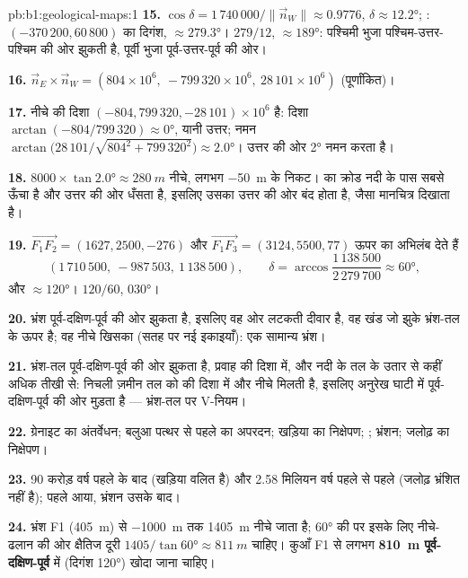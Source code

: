\begin{solution}{pb:b1:geological-maps:1}
\textbf{15.} $\cos\delta = 1\,740\,000/\|\vec n_W\| \approx 0.9776$, $\delta
\approx \ang{12.2}$; : $(-370\,200, 60\,800)$ का दिगंश,
$\approx \ang{279.3}$।  $279/12$,  $\approx \ang{189}$: पश्चिमी भुजा पश्चिम-उत्तर-पश्चिम की ओर झुकती है,
पूर्वी भुजा पूर्व-उत्तर-पूर्व की ओर।

\textbf{16.} $\vec n_E \times \vec n_W = (804 \times 10^6,\ -799\,320 \times
10^6,\ 28\,101 \times 10^6)$ (पूर्णांकित)।

\textbf{17.} नीचे की दिशा $(-804, 799\,320, -28\,101) \times
10^6$ है: दिशा $\arctan(-804/799\,320) \approx \ang{0}$, यानी उत्तर; नमन
$\arctan\bigl(28\,101/\sqrt{804^2 + 799\,320^2}\bigr) \approx \ang{2.0}$।  उत्तर की ओर \ang{2} नमन करता है।

\textbf{18.} $8000 \times \tan\ang{2.0} \approx \qty{280}{m}$ नीचे, लगभग \qty{-50}{m} के निकट।  का क्रोड नदी के
पास सबसे ऊँचा है और उत्तर की ओर धँसता है, इसलिए उसका  उत्तर की ओर बंद होता है, जैसा मानचित्र दिखाता है।

\textbf{19.} $\overrightarrow{F_1F_2} = (1627, 2500, -276)$ और
$\overrightarrow{F_1F_3} = (3124, 5500, 77)$ ऊपर का अभिलंब देते हैं
\[
  (1\,710\,500,\ -987\,503,\ 1\,138\,500), \qquad
  \delta = \arccos\frac{1\,138\,500}{2\,279\,700} \approx \ang{60},
\]
और  $\approx \ang{120}$।  $120/60$,  \ang{030}।

\textbf{20.} भ्रंश पूर्व-दक्षिण-पूर्व की ओर झुकता है, इसलिए वह ओर लटकती दीवार है, वह खंड जो झुके भ्रंश-तल के ऊपर है; वह नीचे खिसका (सतह पर नई इकाइयाँ): एक सामान्य भ्रंश।

\textbf{21.} भ्रंश-तल पूर्व-दक्षिण-पूर्व की ओर झुकता है, प्रवाह की दिशा में, और नदी के तल के उतार से कहीं अधिक
तीखी  से: निचली ज़मीन तल को  की दिशा में और नीचे मिलती है, इसलिए अनुरेख घाटी में पूर्व-दक्षिण-पूर्व की ओर
मुड़ता है --- भ्रंश-तल पर V-नियम।

\textbf{22.} ग्रेनाइट का अंतर्वेधन; बलुआ पत्थर से पहले का अपरदन; खड़िया का निक्षेपण; ; भ्रंशन; जलोढ़ का निक्षेपण।

\textbf{23.} 90 करोड़ वर्ष पहले के बाद (खड़िया वलित है) और 2.58 मिलियन वर्ष पहले से पहले (जलोढ़ भ्रंशित नहीं है);
 पहले आया, भ्रंशन उसके बाद।

\textbf{24.} भ्रंश F1 (\qty{405}{m}) से \qty{-1000}{m} तक \qty{1405}{m} नीचे जाता है; \ang{60} की  पर इसके लिए
नीचे-ढलान की ओर क्षैतिज दूरी $1405/\tan\ang{60} \approx \qty{811}{m}$ चाहिए। कुआँ F1 से लगभग
\textbf{\qty[text-series-to-math=true]{810}{m} पूर्व-दक्षिण-पूर्व} में (दिगंश \ang{120}) खोदा जाना चाहिए।
\end{solution}
